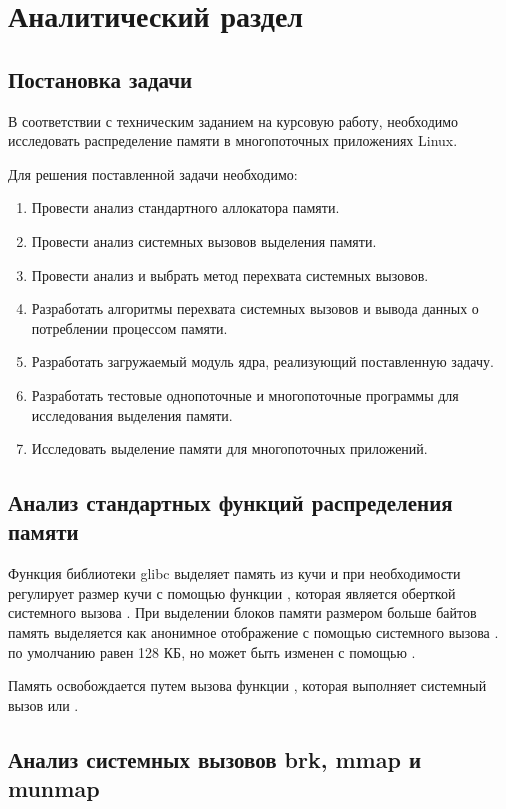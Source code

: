 \chapter{Аналитический раздел}

\section{Постановка задачи}

В соответствии с техническим заданием на курсовую работу, необходимо исследовать распределение памяти в многопоточных приложениях Linux. 

Для решения поставленной задачи необходимо:
\begin{enumerate}
	\item Провести анализ стандартного аллокатора памяти.
	\item Провести анализ системных вызовов выделения памяти.
	\item Провести анализ и выбрать метод перехвата системных вызовов.
	\item Разработать алгоритмы перехвата системных вызовов и вывода данных о потреблении процессом памяти.
	\item Разработать загружаемый модуль ядра, реализующий поставленную задачу.
	\item Разработать тестовые однопоточные и многопоточные программы для исследования выделения памяти.
	\item Исследовать выделение памяти для многопоточных приложений.
\end{enumerate}

\section{Анализ стандартных функций распределения памяти}

Функция  библиотеки glibc выделяет память из кучи и при необходимости регулирует размер кучи с помощью функции , которая является оберткой системного вызова . При выделении блоков памяти размером больше  байтов память выделяется как анонимное отображение с помощью системного вызова .  по умолчанию равен 128 КБ, но может быть изменен с помощью .

Память освобождается путем вызова функции , которая выполняет системный вызов  или .

\section{Анализ системных вызовов brk, mmap и munmap}

